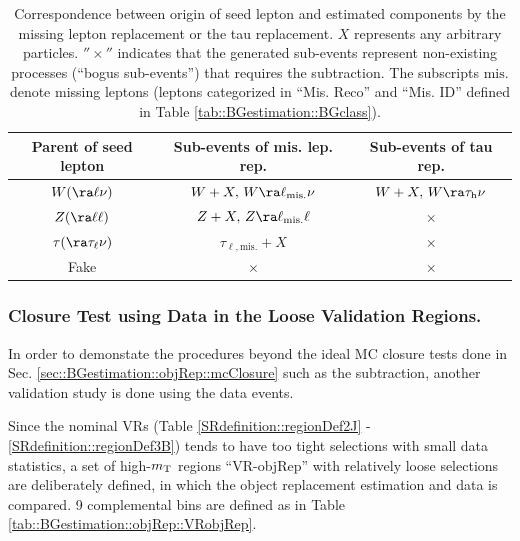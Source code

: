 \begin{table}[h]
  \begin{center}
    \caption{Correspondence between origin of seed lepton and estimated components by the missing lepton replacement or the tau replacement. $X$ represents any arbitrary particles. $''\times''$ indicates that the generated sub-events represent non-existing processes (``bogus sub-events'') that requires the subtraction. The subscripts ${\mathrm{mis.}}$ denote missing leptons (leptons categorized in ``Mis. Reco'' and ``Mis. ID'' defined in Table \ref{tab::BGestimation::BGclass}).
}

    \begin{tabular}{  c | c | c  }
      \hline 
      Parent of seed lepton &   Sub-events of mis. lep. rep.  &  Sub-events of tau rep.  \\
%
      \hline 
      \hline      
      $W (\ra\ell\nu)$ &       $W+X, \, W\ra \ell_{\mathrm{mis.}}\nu$       &      $W+X, \, W\ra\tau_{\mathrm{h}} \nu$ \\
      \hline
      $Z (\ra\ell\ell)$ &       $Z+X, \, Z\ra \ell_{\mathrm{mis.}}\ell$     &      $\times$ \\
      \hline
      $\tau (\ra \tau_\ell \nu)$ &              $\tau_{\ell,{\mathrm{mis.}}}+X$             &      $\times$ \\
      \hline
      Fake &       $\times$       &      $\times$ \\
      \hline
    \end{tabular}  \label{tab::BGestimation::objRep::relProc}
  \end{center}
\end{table}




\clearpage
\subsubsection{Closure Test using Data in the Loose Validation Regions.} \label{sec::BGestimation::objRep::dataClosure}
In order to demonstate the procedures beyond the ideal MC closure tests done in Sec. \ref{sec::BGestimation::objRep::mcClosure} such as the subtraction,
another validation study is done using the data events.

Since the nominal VRs (Table \ref{SRdefinition::regionDef2J} - \ref{SRdefinition::regionDef3B}) tends to have too tight selections with small data statistics, a set of high-$m_{\mathrm{T}}$ regions ``VR-objRep'' with relatively loose selections are deliberately defined, in which the object replacement estimation and data is compared. 9 complemental bins are defined as in Table \ref{tab::BGestimation::objRep::VRobjRep}. \\

